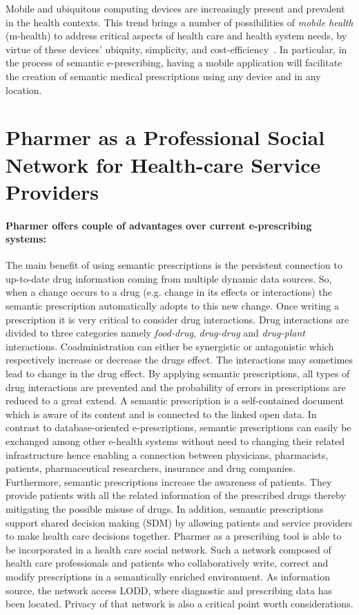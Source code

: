 \documentclass[journal]{IEEEtran}
\begin{document}
Mobile and ubiquitous computing devices are increasingly present and prevalent in the health contexts.
This trend brings a number of possibilities of \emph{mobile health} (m-health) to address critical aspects of health care and health system needs, by virtue of these devices’ ubiquity, simplicity, and cost-efficiency~\cite{mHealth}.
In particular, in the process of semantic e-prescribing, having a mobile application will facilitate the creation of semantic medical prescriptions using any device and in any location.


\section{Pharmer as a Professional Social Network for Health-care Service Providers}
\label{pharmernet}
\paragraph{Pharmer offers couple of advantages over current e-prescribing systems:}
The main benefit of using semantic prescriptions is the persistent connection to up-to-date drug information coming from multiple dynamic data sources.
So, when a change occurs to a drug (e.g. change in its effects or interactions) the semantic prescription automatically adopts to this new change.
Once writing a prescription it is very critical to consider drug interactions.
Drug interactions are divided to three categories namely \emph{food-drug}, \emph{drug-drug} and \emph{drug-plant} interactions.
Coadministration can either be synergistic or antagonistic which respectively increase or decrease the drugs effect.
The interactions may sometimes lead to change in the drug effect.
By applying semantic prescriptions, all types of drug interactions are prevented and the probability of errors in prescriptions are reduced to a great extend.
A semantic prescription is a self-contained document which is aware of its content and is connected to the linked open data.
In contrast to database-oriented e-prescriptions, semantic prescriptions can easily be exchanged among other e-health systems without need to changing their related infrastructure hence enabling a connection between physicians, pharmacists, patients, pharmaceutical researchers, insurance and drug companies.
Furthermore, semantic prescriptions increase the awareness of patients.
They provide patients with all the related information of the prescribed drugs thereby mitigating the possible misuse of drugs.
In addition, semantic prescriptions support shared decision making (SDM) by allowing patients and service providers to make health care decisions together.
Pharmer as a prescribing tool is able to be incorporated in a health care social network.
Such a network composed of health care professionals and patients who collaboratively write, correct and modify prescriptions in a semantically enriched environment.
As information source, the network access LODD, where diagnostic and prescribing data has been located.
Privacy of that network is also a critical point worth considerations.
\end{document}
